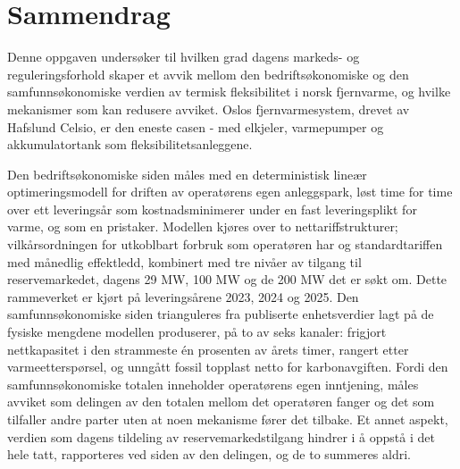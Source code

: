 \section*{Sammendrag}

Denne oppgaven undersøker til hvilken grad dagens markeds- og reguleringsforhold skaper et avvik mellom den bedriftsøkonomiske og den samfunnsøkonomiske verdien av termisk fleksibilitet i norsk fjernvarme, og hvilke mekanismer som kan redusere avviket. Oslos fjernvarmesystem, drevet av Hafslund Celsio, er den eneste casen - med elkjeler, varmepumper og akkumulatortank som fleksibilitetsanleggene.

Den bedriftsøkonomiske siden måles med en deterministisk lineær optimeringsmodell for driften av operatørens egen anleggspark, løst time for time over ett leveringsår som kostnadsminimerer under en fast leveringsplikt for varme, og som en pristaker. Modellen kjøres over to nettariffstrukturer; vilkårsordningen for utkoblbart forbruk som operatøren har og standardtariffen med månedlig effektledd, kombinert med tre nivåer av tilgang til reservemarkedet, dagens 29 MW, 100 MW og de 200 MW det er søkt om. Dette rammeverket er kjørt på leveringsårene 2023, 2024 og 2025. Den samfunnsøkonomiske siden trianguleres fra publiserte enhetsverdier lagt på de fysiske mengdene modellen produserer, på to av seks kanaler: frigjort nettkapasitet i den strammeste én prosenten av årets timer, rangert etter varmeetterspørsel, og unngått fossil topplast netto for karbonavgiften. Fordi den samfunnsøkonomiske totalen inneholder operatørens egen inntjening, måles avviket som delingen av den totalen mellom det operatøren fanger og det som tilfaller andre parter uten at noen mekanisme fører det tilbake. Et annet aspekt, verdien som dagens tildeling av reservemarkedstilgang hindrer i å oppstå i det hele tatt, rapporteres ved siden av den delingen, og de to summeres aldri.


